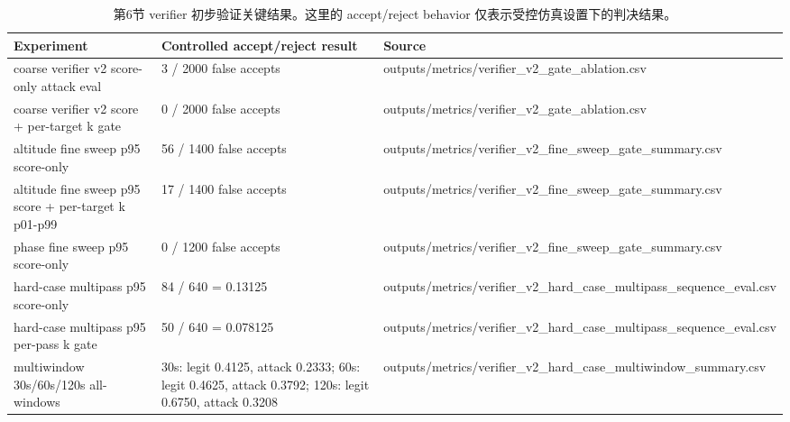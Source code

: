 \begin{table}[htbp]
\centering
\caption{第6节 verifier 初步验证关键结果。这里的 accept/reject behavior 仅表示受控仿真设置下的判决结果。}
\label{tab:section6\_verifier\_results}
\begin{tabular}{lll}
\hline
Experiment & Controlled accept/reject result & Source \\
\hline
coarse verifier v2 score-only attack eval & 3 / 2000 false accepts & outputs/metrics/verifier\_v2\_gate\_ablation.csv \\
coarse verifier v2 score + per-target k gate & 0 / 2000 false accepts & outputs/metrics/verifier\_v2\_gate\_ablation.csv \\
altitude fine sweep p95 score-only & 56 / 1400 false accepts & outputs/metrics/verifier\_v2\_fine\_sweep\_gate\_summary.csv \\
altitude fine sweep p95 score + per-target k p01-p99 & 17 / 1400 false accepts & outputs/metrics/verifier\_v2\_fine\_sweep\_gate\_summary.csv \\
phase fine sweep p95 score-only & 0 / 1200 false accepts & outputs/metrics/verifier\_v2\_fine\_sweep\_gate\_summary.csv \\
hard-case multipass p95 score-only & 84 / 640 = 0.13125 & outputs/metrics/verifier\_v2\_hard\_case\_multipass\_sequence\_eval.csv \\
hard-case multipass p95 per-pass k gate & 50 / 640 = 0.078125 & outputs/metrics/verifier\_v2\_hard\_case\_multipass\_sequence\_eval.csv \\
multiwindow 30s/60s/120s all-windows & 30s: legit 0.4125, attack 0.2333; 60s: legit 0.4625, attack 0.3792; 120s: legit 0.6750, attack 0.3208 & outputs/metrics/verifier\_v2\_hard\_case\_multiwindow\_summary.csv \\
\hline
\end{tabular}
\end{table}
